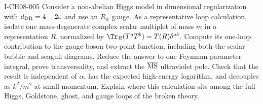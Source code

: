 \begin{exercise}{I-CH08-005}
Consider a non-abelian Higgs model in dimensional regularization with
$d_{\rm DR}=4-2\varepsilon$ and use an $R_\alpha$ gauge.  As a representative loop calculation, isolate one
mass-degenerate complex scalar multiplet of mass $m$ in a representation $R$,
normalized by $\Tr_R(T^aT^b)=T(R)\delta^{ab}$.  Compute its one-loop
contribution to the gauge-boson two-point function, including both the scalar
bubble and seagull diagrams.  Reduce the answer to one Feynman-parameter
integral, prove transversality, and extract the $\overline{\rm MS}$ ultraviolet
pole.  Check that the result is independent of $\alpha$, has the expected
high-energy logarithm, and decouples as $k^2/m^2$ at small momentum.  Explain
where this calculation sits among the full Higgs, Goldstone, ghost, and gauge
loops of the broken theory.
\end{exercise}
